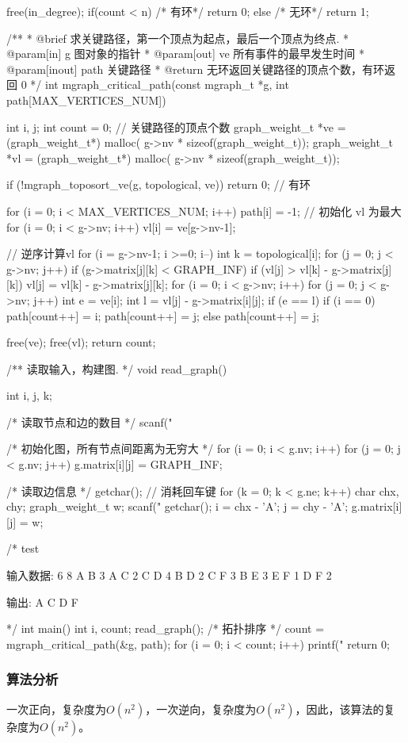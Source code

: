 \begin{Codex}[label=mgraph_critical_path.c]
{    free(in_degree);
    if(count < n) { /* 有环*/
        return 0;
    } else { /* 无环*/
        return 1;
    }
}

/**
  * @brief 求关键路径，第一个顶点为起点，最后一个顶点为终点.
  * @param[in] g 图对象的指针
  * @param[out] ve 所有事件的最早发生时间
  * @param[inout] path 关键路径
  * @return 无环返回关键路径的顶点个数，有环返回 0
  */
int mgraph_critical_path(const mgraph_t *g, int path[MAX_VERTICES_NUM]) {
    int i, j;
    int count = 0;    // 关键路径的顶点个数
    graph_weight_t *ve = (graph_weight_t*) malloc(
            g->nv * sizeof(graph_weight_t));
    graph_weight_t *vl = (graph_weight_t*) malloc(
            g->nv * sizeof(graph_weight_t));

    if (!mgraph_toposort_ve(g, topological, ve)) return 0;  // 有环

    for (i = 0; i < MAX_VERTICES_NUM; i++) path[i] = -1;
    // 初始化 vl 为最大
    for (i = 0; i < g->nv; i++) vl[i] = ve[g->nv-1];

    // 逆序计算vl
    for (i = g->nv-1; i >=0; i--) {
        int k = topological[i];
        for (j = 0; j < g->nv; j++) {
            if (g->matrix[j][k] < GRAPH_INF) {
                if (vl[j] > vl[k] - g->matrix[j][k])
                    vl[j] = vl[k] - g->matrix[j][k];
            }
        }
    }
    for (i = 0; i < g->nv; i++) {
        for (j = 0; j < g->nv; j++) {
            int e = ve[i];
            int l = vl[j] - g->matrix[i][j];
            if (e == l) {
                if (i == 0) {
                    path[count++] = i;
                    path[count++] = j;
                } else {
                    path[count++] = j;
                }
            }
        }
    }

    free(ve);
    free(vl);
    return count;
}

/** 读取输入，构建图. */
void read_graph() {
    int i, j, k;

    /* 读取节点和边的数目 */
    scanf("%

    /* 初始化图，所有节点间距离为无穷大 */
    for (i = 0; i < g.nv; i++) {
        for (j = 0; j < g.nv; j++) {
            g.matrix[i][j] = GRAPH_INF;
        }
    }

    /* 读取边信息 */
    getchar(); // 消耗回车键
    for (k = 0; k < g.ne; k++) {
        char chx, chy;
        graph_weight_t w;
        scanf("%
        getchar();
        i = chx - 'A';
        j = chy - 'A';
        g.matrix[i][j] = w;
    }
}

/* test

输入数据:
6 8
A B 3
A C 2
C D 4
B D 2
C F 3
B E 3
E F 1
D F 2

输出: A C D F

*/
int main() {
    int i, count;
    read_graph();
    /* 拓扑排序 */
    count = mgraph_critical_path(&g, path);
    for (i = 0; i < count; i++) {
        printf("%
    }
    return 0;
}
\end{Codex}

\subsubsection{算法分析}
一次正向，复杂度为$O(n^2)$，一次逆向，复杂度为$O(n^2)$，因此，该算法的复杂度为$O(n^2)$。
